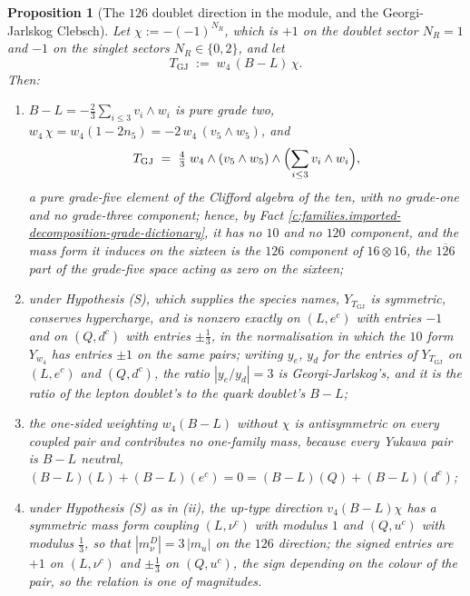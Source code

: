 \documentclass[11pt]{article}
\newtheorem{proposition}[theorem]{Proposition}
\theoremstyle{definition}
\theoremstyle{plain}
\newcommand{\changedmark}[2]{\marginpar{\raggedright\scriptsize\color{#1}#2}}
\begin{document}
\begin{proposition}[The $126$ doublet direction in the module, and the Georgi-Jarlskog Clebsch]\label{c:families.doublet-direction-module-georgi-jarlskog-clebsch}
\changedmark{gray}{reworded}
Let $\chi := -(-1)^{N_{R}}$, which is $+1$ on the doublet sector $N_{R} = 1$ and $-1$ on the singlet sectors $N_{R} \in \{0, 2\}$, and let
\[
T_{\mathrm{GJ}} \;:=\; w_{4}\,(B - L)\,\chi .
\]
Then:
\begin{enumerate}
\item[(i)] $B - L = -\tfrac23\sum_{i \le 3} v_{i}\wedge w_{i}$ is pure grade two, $w_{4}\,\chi = w_{4}(1 - 2n_{5}) = -2\,w_{4}\,(v_{5}\wedge w_{5})$, and
\[
T_{\mathrm{GJ}} \;=\; \tfrac43\; w_{4}\wedge (v_{5}\wedge w_{5}) \wedge \Bigl(\sum_{i\le 3} v_{i}\wedge w_{i}\Bigr),
\]
a pure grade-five element of the Clifford algebra of the ten, with no grade-one and no grade-three component; hence, by Fact \ref{c:families.imported-decomposition-grade-dictionary}, it has no $10$ and no $120$ component, and the mass form it induces on the sixteen is the $126$ component of $16 \otimes 16$, the $\overline{126}$ part of the grade-five space acting as zero on the sixteen;
\item[(ii)] under Hypothesis (S), which supplies the species names, $Y_{T_{\mathrm{GJ}}}$ is symmetric, conserves hypercharge, and is nonzero exactly on $(L, e^{c})$ with entries $-1$ and on $(Q, d^{c})$ with entries $\pm\tfrac13$, in the normalisation in which the $10$ form $Y_{w_{4}}$ has entries $\pm1$ on the same pairs; writing $y_{e}$, $y_{d}$ for the entries of $Y_{T_{\mathrm{GJ}}}$ on $(L, e^{c})$ and $(Q, d^{c})$, the ratio $|y_{e}/y_{d}| = 3$ is Georgi-Jarlskog's, and it is the ratio of the lepton doublet's to the quark doublet's $B - L$;
\item[(iii)] the one-sided weighting $w_{4}(B - L)$ without $\chi$ is antisymmetric on every coupled pair and contributes no one-family mass, because every Yukawa pair is $B - L$ neutral, $(B-L)(L) + (B-L)(e^{c}) = 0 = (B-L)(Q) + (B-L)(d^{c})$;
\item[(iv)] under Hypothesis (S) as in (ii), the up-type direction $v_{4}(B - L)\chi$ has a symmetric mass form coupling $(L, \nu^{c})$ with modulus $1$ and $(Q, u^{c})$ with modulus $\tfrac13$, so that $|m_{\nu}^{D}| = 3\,|m_{u}|$ on the $126$ direction; the signed entries are $+1$ on $(L, \nu^{c})$ and $\pm\tfrac13$ on $(Q, u^{c})$, the sign depending on the colour of the pair, so the relation is one of magnitudes.
\end{enumerate}
\end{proposition}
\end{document}

